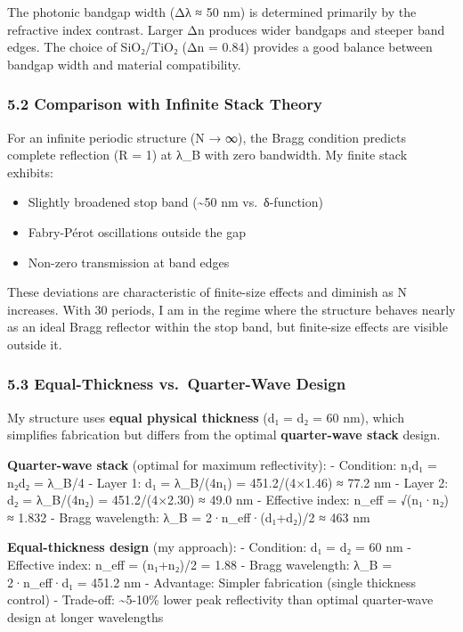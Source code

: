 \documentclass[
]{article}
\providecommand{\tightlist}{%
  \setlength{\itemsep}{0pt}\setlength{\parskip}{0pt}}
\begin{document}
The photonic bandgap width (Δλ ≈ 50 nm) is determined primarily by the
refractive index contrast. Larger Δn produces wider bandgaps and steeper
band edges. The choice of SiO₂/TiO₂ (Δn = 0.84) provides a good balance
between bandgap width and material compatibility.

\subsubsection{5.2 Comparison with Infinite Stack
Theory}\label{comparison-with-infinite-stack-theory}

For an infinite periodic structure (N → ∞), the Bragg condition predicts
complete reflection (R = 1) at λ\_B with zero bandwidth. My finite stack
exhibits:

\begin{itemize}
\tightlist
\item
  Slightly broadened stop band (\textasciitilde50 nm vs.~δ-function)
\item
  Fabry-Pérot oscillations outside the gap
\item
  Non-zero transmission at band edges
\end{itemize}

These deviations are characteristic of finite-size effects and diminish
as N increases. With 30 periods, I am in the regime where the structure
behaves nearly as an ideal Bragg reflector within the stop band, but
finite-size effects are visible outside it.

\subsubsection{5.3 Equal-Thickness vs.~Quarter-Wave
Design}\label{equal-thickness-vs.-quarter-wave-design}

My structure uses \textbf{equal physical thickness} (d₁ = d₂ = 60 nm),
which simplifies fabrication but differs from the optimal
\textbf{quarter-wave stack} design.

\textbf{Quarter-wave stack} (optimal for maximum reflectivity): -
Condition: n₁d₁ = n₂d₂ = λ\_B/4 - Layer 1: d₁ = λ\_B/(4n₁) =
451.2/(4×1.46) ≈ 77.2 nm - Layer 2: d₂ = λ\_B/(4n₂) = 451.2/(4×2.30) ≈
49.0 nm - Effective index: n\_eff = √(n₁·n₂) ≈ 1.832 - Bragg wavelength:
λ\_B = 2·n\_eff·(d₁+d₂)/2 ≈ 463 nm

\textbf{Equal-thickness design} (my approach): - Condition: d₁ = d₂ = 60
nm - Effective index: n\_eff = (n₁+n₂)/2 = 1.88 - Bragg wavelength: λ\_B
= 2·n\_eff·d₁ = 451.2 nm - Advantage: Simpler fabrication (single
thickness control) - Trade-off: \textasciitilde5-10\% lower peak
reflectivity than optimal quarter-wave design at longer wavelengths
\end{document}
